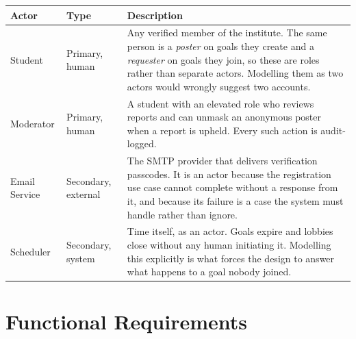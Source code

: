 \documentclass[twoside,12pt]{tietreport}
\begin{document}
\begin{longtable}{@{}p{3.4cm}p{2.2cm}p{7.4cm}@{}}
\toprule
\textbf{Actor} & \textbf{Type} & \textbf{Description} \\
\midrule
\endhead
Student &
Primary, human &
Any verified member of the institute. The same person is a \emph{poster} on
goals they create and a \emph{requester} on goals they join, so these are roles
rather than separate actors. Modelling them as two actors would wrongly suggest
two accounts. \\
\addlinespace
Moderator &
Primary, human &
A student with an elevated role who reviews reports and can unmask an anonymous
poster when a report is upheld. Every such action is audit-logged. \\
\addlinespace
Email Service &
Secondary, external &
The SMTP provider that delivers verification passcodes. It is an actor because
the registration use case cannot complete without a response from it, and
because its failure is a case the system must handle rather than ignore. \\
\addlinespace
Scheduler &
Secondary, system &
Time itself, as an actor. Goals expire and lobbies close without any human
initiating it. Modelling this explicitly is what forces the design to answer
what happens to a goal nobody joined. \\
\bottomrule
\end{longtable}

\section{Functional Requirements}
\end{document}
